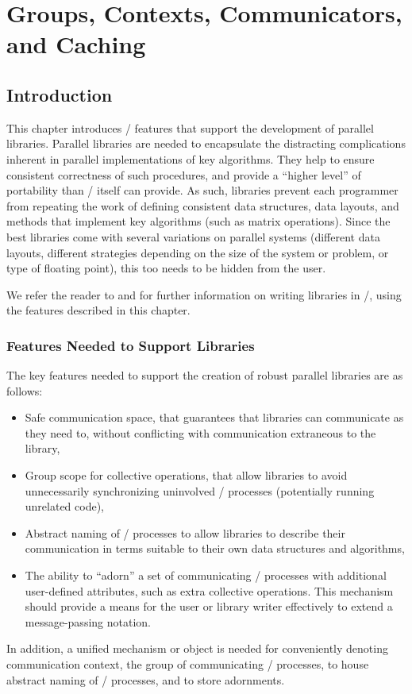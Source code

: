 \chapter{Groups, Contexts, Communicators, and Caching}
\label{sec:context}
\label{chap:context}

\section{Introduction}
\label{sec:context:intro}
This chapter introduces \MPI/
features that support the development of parallel libraries.
Parallel libraries are needed to encapsulate the distracting complications
inherent in parallel implementations of key algorithms. They help to ensure
consistent correctness of such procedures, and provide a ``higher level'' of
portability than \MPI/ itself can provide. As such, libraries prevent each
programmer from repeating the work of defining consistent data structures,
data layouts, and methods that implement key algorithms (such as matrix
operations). Since the best libraries come with several variations on
parallel systems (different data layouts, different strategies depending on
the size of the system or problem, or type of floating point), this too
needs to be hidden from the user.


We refer the reader to \cite{MPIPP} and \cite{MPILIB}
for further information on writing libraries in \MPI/, using
the features described in this chapter.

\subsection{Features Needed to Support Libraries}
\label{sec:context:libraries}

The  key features needed to support
the creation of robust parallel libraries are as follows:
\begin{itemize}
\item Safe communication space, that guarantees that
libraries can communicate as they need to, without conflicting with
communication extraneous to the library,
\item Group scope for collective operations, that allow
libraries to avoid unnecessarily synchronizing uninvolved
\MPI/ processes (potentially running unrelated code),
\item Abstract naming of \MPI/ processes to allow libraries to describe
their communication in terms suitable to their own data
structures and algorithms,
\item The ability to ``adorn'' a set of communicating \MPI/ processes with
additional user-defined attributes, such as extra collective
operations. This mechanism should provide a means for the
user or library writer effectively to extend a message-passing
notation.
\end{itemize}
In addition, a unified mechanism or object is needed for conveniently denoting
communication context, the group of communicating \MPI/ processes, to house abstract
naming of \MPI/ processes, and to store adornments.

